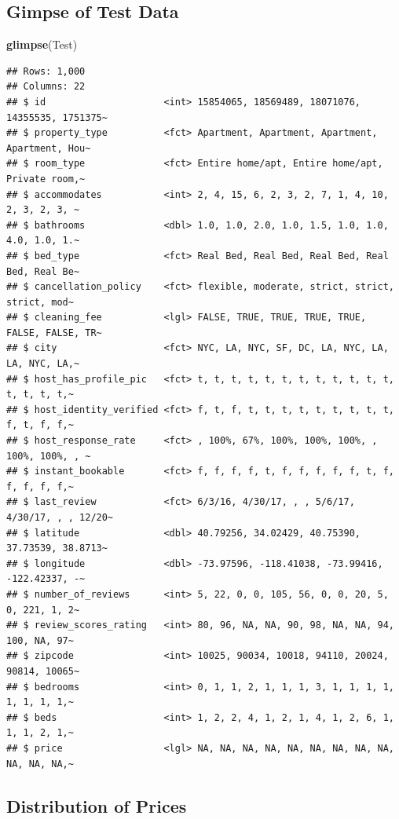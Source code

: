 \documentclass[]{book}
\newenvironment{Shaded}{\begin{snugshade}}{\end{snugshade}}
\newcommand{\KeywordTok}[1]{\textcolor[rgb]{0.13,0.29,0.53}{\textbf{#1}}}
\newcommand{\NormalTok}[1]{#1}
\begin{document}
\subsection{Gimpse of Test Data}\label{gimpse-of-test-data}

\begin{Shaded}
\begin{Highlighting}[]
\KeywordTok{glimpse}\NormalTok{(Test)}
\end{Highlighting}
\end{Shaded}

\begin{verbatim}
## Rows: 1,000
## Columns: 22
## $ id                     <int> 15854065, 18569489, 18071076, 14355535, 1751375~
## $ property_type          <fct> Apartment, Apartment, Apartment, Apartment, Hou~
## $ room_type              <fct> Entire home/apt, Entire home/apt, Private room,~
## $ accommodates           <int> 2, 4, 15, 6, 2, 3, 2, 7, 1, 4, 10, 2, 3, 2, 3, ~
## $ bathrooms              <dbl> 1.0, 1.0, 2.0, 1.0, 1.5, 1.0, 1.0, 4.0, 1.0, 1.~
## $ bed_type               <fct> Real Bed, Real Bed, Real Bed, Real Bed, Real Be~
## $ cancellation_policy    <fct> flexible, moderate, strict, strict, strict, mod~
## $ cleaning_fee           <lgl> FALSE, TRUE, TRUE, TRUE, TRUE, FALSE, FALSE, TR~
## $ city                   <fct> NYC, LA, NYC, SF, DC, LA, NYC, LA, LA, NYC, LA,~
## $ host_has_profile_pic   <fct> t, t, t, t, t, t, t, t, t, t, t, t, t, t, t, t,~
## $ host_identity_verified <fct> f, t, f, t, t, t, t, t, t, t, t, t, f, t, f, f,~
## $ host_response_rate     <fct> , 100%, 67%, 100%, 100%, 100%, , 100%, 100%, , ~
## $ instant_bookable       <fct> f, f, f, f, t, f, f, f, f, f, t, f, f, f, f, f,~
## $ last_review            <fct> 6/3/16, 4/30/17, , , 5/6/17, 4/30/17, , , 12/20~
## $ latitude               <dbl> 40.79256, 34.02429, 40.75390, 37.73539, 38.8713~
## $ longitude              <dbl> -73.97596, -118.41038, -73.99416, -122.42337, -~
## $ number_of_reviews      <int> 5, 22, 0, 0, 105, 56, 0, 0, 20, 5, 0, 221, 1, 2~
## $ review_scores_rating   <int> 80, 96, NA, NA, 90, 98, NA, NA, 94, 100, NA, 97~
## $ zipcode                <int> 10025, 90034, 10018, 94110, 20024, 90814, 10065~
## $ bedrooms               <int> 0, 1, 1, 2, 1, 1, 1, 3, 1, 1, 1, 1, 1, 1, 1, 1,~
## $ beds                   <int> 1, 2, 2, 4, 1, 2, 1, 4, 1, 2, 6, 1, 1, 1, 2, 1,~
## $ price                  <lgl> NA, NA, NA, NA, NA, NA, NA, NA, NA, NA, NA, NA,~
\end{verbatim}

\subsection{Distribution of Prices}\label{distribution-of-prices}
\end{document}
